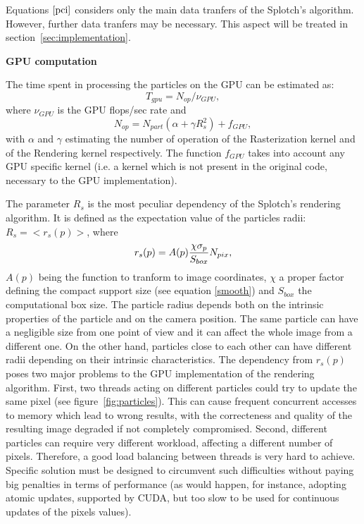 \documentclass[11pt]{article}
\begin{document}
Equations $\eqref{pci}$ considers only the main data tranfers of
the Splotch's algorithm. However, further data tranfers may be necessary.
This aspect will be treated in section~\ref{sec:implementation}.

\medskip
\noindent
{\bf GPU computation}

The time spent in processing the particles on the GPU can be estimated as:
\begin{equation}
T_{gpu} = N_{op}/\nu_{GPU},
\end{equation}
where $\nu_{GPU}$ is the GPU flops/sec rate and
\begin{equation}\label{ops}
N_{op} = N_{part}(\alpha + \gamma R_s^2) + f_{GPU},
\end{equation}
with $\alpha$ and $\gamma$ estimating the number of operation of 
the Rasterization kernel  
and of the Rendering kernel respectively. The function 
$f_{GPU}$ takes into account any GPU specific kernel (i.e. a kernel
which is not present in the original code, necessary to the GPU implementation). 

The parameter $R_s$ is the most peculiar dependency of the Splotch's rendering
algorithm. It is defined as the expectation value of the particles radii:
$R_s = <r_s(p)>$, where
\begin{equation}\label{radius}
r_s(p) = A(p){\chi \sigma_p\over S_{box}} N_{pix},
\end{equation} 
$A(p)$ being the function to tranform to image coordinates,
$\chi$ a proper factor defining the compact support size (see  
equation \eqref{smooth}) and $S_{box}$ the computational box size.
The particle radius depends both on the intrinsic properties of the particle
and on the camera position. The same particle can have a negligible size
from one point of view and it can affect the whole image from a different one.
On the other hand, particles close to each other can have different radii depending
on their intrinsic characteristics. The dependency from $r_s(p)$ poses 
two major problems to the GPU implementation of the rendering 
algorithm. First, two threads acting on different particles could try 
to update the same pixel (see figure~\ref{fig:particles}).
This can cause frequent concurrent accesses to memory
which lead to wrong results, with the correcteness and quality of the resulting image 
degraded if not completely compromised.
Second, different particles can require very different workload, affecting 
a different number of pixels. Therefore, a good load balancing
between threads is very hard to achieve.  
Specific solution must be designed to circumvent such difficulties 
without paying big penalties in terms of performance (as would happen, for instance,
adopting atomic updates, supported by CUDA, but too slow to be used for continuous 
updates of the pixels values).
\end{document}
